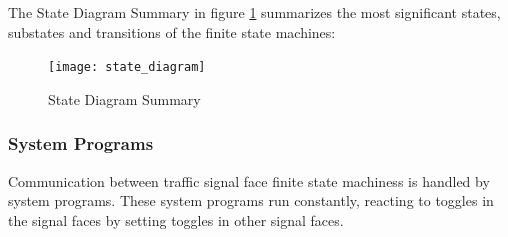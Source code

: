 \documentclass[letterpaper,twoside]{article}
\begin{document}
The State Diagram Summary in figure \ref{fig:State_Diagram_Summary}
summarizes the most significant states, substates and
transitions of the finite state machines:

\begin{figure}[htb]
  {\texttt{[image: state\_diagram]}}
  {\caption{State Diagram Summary}\label{fig:State_Diagram_Summary}}
\end{figure}

\subsubsection{System Programs}

Communication between traffic signal face finite state machiness is handled by
system programs.
These system programs run constantly, reacting to toggles in the
signal faces by setting toggles in other signal faces.
\end{document}
